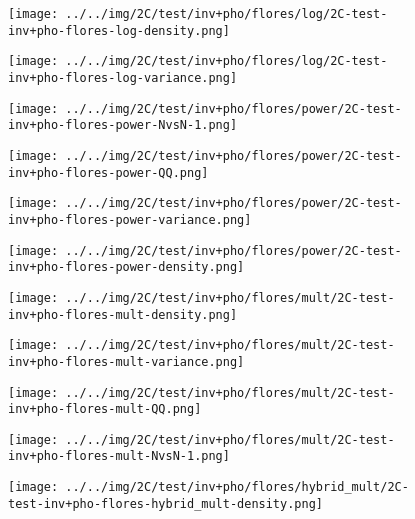 \begin{figure}[H]
\centering	\texttt{[image: ../../img/2C/test/inv+pho/flores/log/2C-test-inv+pho-flores-log-density.png]}
\end{figure}
\begin{figure}[H]
\centering	\texttt{[image: ../../img/2C/test/inv+pho/flores/log/2C-test-inv+pho-flores-log-variance.png]}
\end{figure}
\begin{figure}[H]
\centering	\texttt{[image: ../../img/2C/test/inv+pho/flores/power/2C-test-inv+pho-flores-power-NvsN-1.png]}
\end{figure}
\begin{figure}[H]
\centering	\texttt{[image: ../../img/2C/test/inv+pho/flores/power/2C-test-inv+pho-flores-power-QQ.png]}
\end{figure}
\begin{figure}[H]
\centering	\texttt{[image: ../../img/2C/test/inv+pho/flores/power/2C-test-inv+pho-flores-power-variance.png]}
\end{figure}
\begin{figure}[H]
\centering	\texttt{[image: ../../img/2C/test/inv+pho/flores/power/2C-test-inv+pho-flores-power-density.png]}
\end{figure}
\begin{figure}[H]
\centering	\texttt{[image: ../../img/2C/test/inv+pho/flores/mult/2C-test-inv+pho-flores-mult-density.png]}
\end{figure}
\begin{figure}[H]
\centering	\texttt{[image: ../../img/2C/test/inv+pho/flores/mult/2C-test-inv+pho-flores-mult-variance.png]}
\end{figure}
\begin{figure}[H]
\centering	\texttt{[image: ../../img/2C/test/inv+pho/flores/mult/2C-test-inv+pho-flores-mult-QQ.png]}
\end{figure}
\begin{figure}[H]
\centering	\texttt{[image: ../../img/2C/test/inv+pho/flores/mult/2C-test-inv+pho-flores-mult-NvsN-1.png]}
\end{figure}
\begin{figure}[H]
\centering	\texttt{[image: ../../img/2C/test/inv+pho/flores/hybrid\_mult/2C-test-inv+pho-flores-hybrid\_mult-density.png]}
\end{figure}
